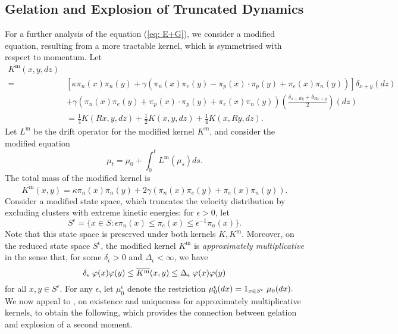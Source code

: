 \subsection{Gelation and Explosion of Truncated Dynamics}
 For a further analysis of the equation (\ref{eq: E+G}), we consider a modified equation, resulting from a more tractable kernel, which is symmetrised with respect to momentum. Let
 \begin{equation}\label{eq: modified K} 
 \begin{split}
 K^\mathrm{m}(x,y,dz)& \\  = & \left[\kappa \pi_n(x) \pi_n(y) +\gamma\left(\pi_n(x)\pi_e(y)-\pi_p(x)\cdot \pi_p(y)+ \pi_e(x)\pi_n(y)\right)\right]\delta_{x+y}(dz) \\ & + \gamma(\pi_n(x)\pi_e(y)+\pi_p(x)\cdot \pi_p(y)+ \pi_e(x)\pi_n(y))\left(\frac{\delta_{x+Ry}+\delta_{Rx+y}}{2}\right)(dz) \\ & 
 =\frac{1}{4}K(Rx, y, dz)+\frac{1}{2}K(x,y,dz)+\frac{1}{4}K(x,Ry, dz). \end{split} 
\end{equation}
Let $L^\mathrm{m}$ be the drift operator for the modified kernel $K^\mathrm{m}$, and consider the modified equation \begin{equation} \tag{mE-G}\label{eq: mE}
    \mu_t=\mu_0+\int_0^t L^\mathrm{m}(\mu_s)ds.
\end{equation}The total mass of the modified kernel is \begin{equation}
    \label{eq: modified Kbar} 
    \overline{K^\mathrm{m}}(x,y)=\kappa \pi_n(x) \pi_n(y) + 2\gamma(\pi_n(x)\pi_e(y)+\pi_e(x)\pi_n(y)).
\end{equation}
Consider a modified state space, which truncates the velocity distribution by excluding clusters with extreme kinetic energies: for $\epsilon>0$, let \begin{equation}
    S^\epsilon= \{x\in S: \epsilon \pi_n(x) \leq \pi_e(x) \leq \epsilon^{-1} \pi_n(x)\}.
\end{equation} Note that this state space is preserved under both kernels $K, K^\mathrm{m}$. Moreover, on the reduced state space $S^\epsilon$, the modified kernel $K^\mathrm{m}$ is \emph{approximately multiplicative} \cite{N00} in the sense that, for some $\delta_\epsilon>0$ and $\Delta_\epsilon<\infty$, we have \begin{equation}
    \delta_\epsilon\hspace{0.1cm}\varphi(x)\varphi(y) \leq \overline{K^\mathrm{m}}(x,y) \leq  \Delta_\epsilon\hspace{0.1cm}\varphi(x)\varphi(y)
\end{equation}for all $x,y \in S^\epsilon$. For any $\epsilon$, let $\mu_0^\epsilon$ denote the restriction $\mu_0^\epsilon(dx)=1_{x\in S^\epsilon}\hspace{0.1cm}\mu_0(dx).$ We now appeal to \cite[Theorem 2.2]{N00}, on existence and uniqueness for approximately multiplicative kernels, to obtain the following, which provides the connection between gelation and explosion of a second moment.
